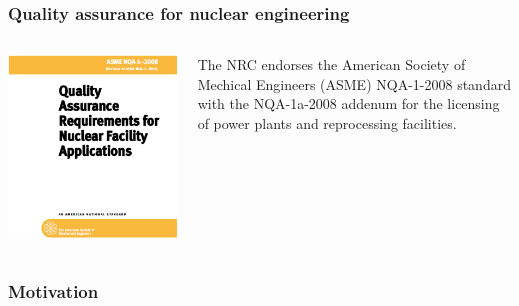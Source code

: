 \documentclass[12pt]{beamer}
\begin{document}
\begin{frame}[fragile]
\frametitle{Quality assurance for nuclear engineering}

\begin{columns}[T]
\begin{column}{0.5\textwidth}
\includegraphics[width=\textwidth]{figures/nqa-1-2008.png}
\end{column}
\begin{column}{0.5\textwidth}
The NRC \cite{NRC} endorses the American Society of Mechical Engineers (ASME)
NQA-1-2008 standard with the NQA-1a-2008 addenum for the licensing of power
plants and reprocessing facilities.
\end{column}
\end{columns}


\end{frame}
\begin{frame}[fragile]
\frametitle{Motivation}

\end{frame}


\end{document}
